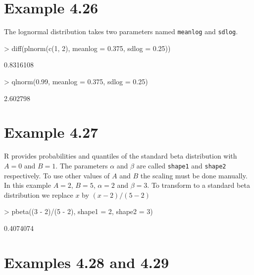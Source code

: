\documentclass{book}
\begin{document}
\section{Example 4.26}
\label{sec:xmp0426}

The lognormal distribution takes two parameters named \texttt{meanlog}
and \texttt{sdlog}.
\begin{Schunk}
\begin{Sinput}
> diff(plnorm(c(1, 2), meanlog = 0.375, sdlog = 0.25))
\end{Sinput}
\begin{Soutput}
[1] 0.8316108
\end{Soutput}
\begin{Sinput}
> qlnorm(0.99, meanlog = 0.375, sdlog = 0.25)
\end{Sinput}
\begin{Soutput}
[1] 2.602798
\end{Soutput}
\end{Schunk}


\section{Example 4.27}
\label{sec:xmp0427}

R provides probabilities and quantiles of the standard beta
distribution with $A=0$ and $B=1$. The parameters $\alpha$ and $\beta$
are called \texttt{shape1} and \texttt{shape2} respectively.  To use
other values of $A$ and $B$ the scaling must be done manually.  In
this example $A=2$, $B=5$, $\alpha=2$ and $\beta=3$.  To transform to
a standard beta distribution we replace $x$ by $(x-2)/(5-2)$
\begin{Schunk}
\begin{Sinput}
> pbeta((3 - 2)/(5 - 2), shape1 = 2, shape2 = 3)
\end{Sinput}
\begin{Soutput}
[1] 0.4074074
\end{Soutput}
\end{Schunk}


\section{Examples 4.28 and 4.29}
\label{sec:xmp0428}
\end{document}
